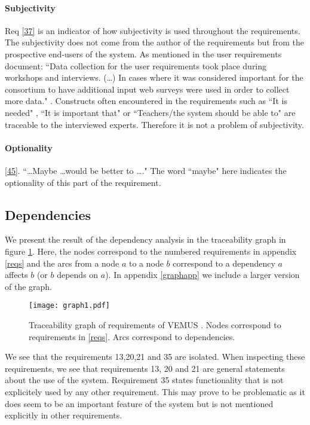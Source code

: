\documentclass[a4paper,twoside, twocolumn,11pt]{article}
\numberwithin{equation}{section}
\begin{document}
\paragraph{Subjectivity}
Req \ref{37} is an indicator of how subjectivity is used throughout the requirements. The subjectivity does not come from the author of the requirements but from the prospective end-users of the system. As mentioned in the user requirements document: ``Data collection for the user requirements took place during workshops and interviews. (\ldots) In cases where it was considered important for the consortium to have additional input web surveys were used in order to collect more data." \cite{VEMUS}. Constructs often encountered in the requirements such as ``It is needed" , ``It is important that" or ``Teachers/the system should be able to" are traceable to the interviewed experts. Therefore it is not a problem of subjectivity.

\paragraph{Optionality}
\ref{45}. ``\ldots Maybe \ldots would be better to \ldots." The word ``maybe" here indicates the optionality of this part of the requirement.

\subsection{Dependencies}
We present the result of the dependency analysis in the traceability graph in figure \ref{fig:graph}. Here, the nodes correspond to the numbered requirements in appendix \ref{reqs} and the arcs from a node $a$ to a node $b$ correspond to a dependency $a$ affects $b$ (or $b$ depends on $a$). In appendix \ref{graphapp} we include a larger version of the graph.

\begin{figure}
\center
\texttt{[image: graph1.pdf]}
\caption{Traceability graph of requirements of VEMUS \cite{VEMUS}. Nodes correspond to requirements in \ref{reqs}. Arcs correspond to dependencies.}
\label{fig:graph}
\end{figure}

We see that the requirements 13,20,21 and 35 are isolated. When inspecting these requirements, we see that requirements 13, 20 and 21 are general statements about the use of the system. 
Requirement 35 states functionality that is not explicitely used by any other requirement. This may prove to be problematic as it does seem to be an important feature of the system but is not mentioned explicitly in other requirements.
\end{document}
